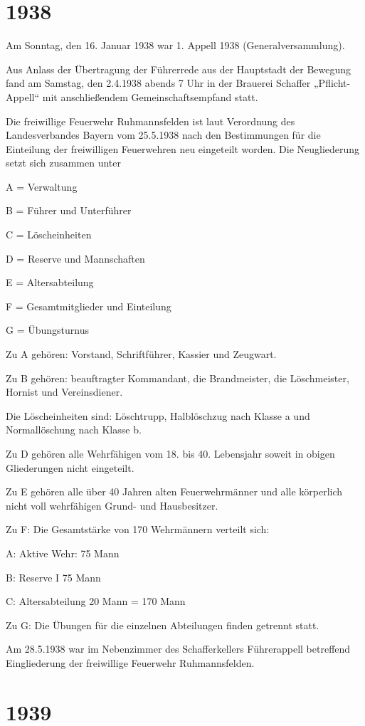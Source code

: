 \documentclass[12pt,a4paper]{book}
\begin{document}
\section*{1938}

Am Sonntag, den 16. Januar 1938 war 1. Appell 1938 (Generalversammlung).

Aus Anlass der Übertragung der Führerrede aus der Hauptstadt der Bewegung fand
am Samstag, den 2.4.1938 abends 7 Uhr in der Brauerei Schaffer „Pflicht-Appell“
mit anschließendem Gemeinschaftsempfand statt.

Die freiwillige Feuerwehr Ruhmannsfelden ist laut Verordnung des Landesverbandes
Bayern vom 25.5.1938 nach den Bestimmungen für die Einteilung der freiwilligen
Feuerwehren neu eingeteilt worden. Die Neugliederung setzt sich zusammen unter

A = Verwaltung

B = Führer und Unterführer

C = Löscheinheiten

D = Reserve und Mannschaften

E = Altersabteilung

F = Gesamtmitglieder und Einteilung

G = Übungsturnus

Zu A gehören: Vorstand, Schriftführer, Kassier und Zeugwart.

Zu B gehören: beauftragter Kommandant, die Brandmeister, die Löschmeister,
Hornist und Vereinsdiener.

Die Löscheinheiten sind: Löschtrupp, Halblöschzug nach Klasse a und
Normallöschung nach Klasse b.

Zu D gehören alle Wehrfähigen vom 18. bis 40. Lebensjahr soweit in obigen
Gliederungen nicht eingeteilt.

Zu E gehören alle über 40 Jahren alten Feuerwehrmänner und alle körperlich nicht
voll wehrfähigen Grund- und Hausbesitzer.

Zu F: Die Gesamtstärke von 170 Wehrmännern verteilt sich:

A: Aktive Wehr: 75 Mann

B: Reserve I 75 Mann

C: Altersabteilung 20 Mann = 170 Mann

Zu G: Die Übungen für die einzelnen Abteilungen finden getrennt statt.

Am 28.5.1938 war im Nebenzimmer des Schafferkellers Führerappell betreffend
Eingliederung der freiwillige Feuerwehr Ruhmannsfelden.

\section*{1939}
\end{document}
